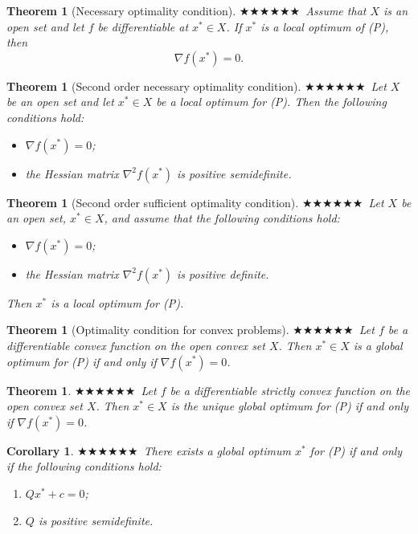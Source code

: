 \documentclass[11pt,a4paper]{article}
\theoremstyle{breakdef}
\theoremstyle{breakplain}
\newtheorem{theorem}[definition]{Theorem}
\newtheorem{corollary}[definition]{Corollary}
\theoremstyle{remark}
\newcommand{\imp}[1]{\textcolor{impcolor}{%
  \ifcase#1\or$\bigstar$\or$\bigstar\bigstar$\or$\bigstar\bigstar\bigstar$\fi}\ }
\begin{document}
\begin{theorem}[Necessary optimality condition]
    \imp{3}Assume that $X$ is an open set and let $f$ be differentiable at $x^* \in X$. If $x^*$ is a local optimum of (P), then
    \[
        \nabla f(x^*)=0.
    \]
\end{theorem}

\begin{theorem}[Second order necessary optimality condition]
    \imp{2}Let $X$ be an open set and let $x^* \in X$ be a local optimum for (P). Then the following conditions hold:
    \begin{itemize}
        \item $\nabla f(x^*)=0$;
        \item the Hessian matrix $\nabla^2 f(x^*)$ is positive semidefinite.
    \end{itemize}
\end{theorem}

\begin{theorem}[Second order sufficient optimality condition]
    \imp{3}Let $X$ be an open set, $x^* \in X$, and assume that the following conditions hold:
    \begin{itemize}
        \item $\nabla f(x^*)=0$;
        \item the Hessian matrix $\nabla^2 f(x^*)$ is positive definite.
    \end{itemize}
    Then $x^*$ is a local optimum for (P).
\end{theorem}

\begin{theorem}[Optimality condition for convex problems]
    \imp{3}Let $f$ be a differentiable convex function on the open convex set $X$. Then $x^* \in X$ is a global optimum for (P) if and only if $\nabla f(x^*)=0$.
\end{theorem}

\begin{theorem}
    \imp{2}Let $f$ be a differentiable strictly convex function on the open convex set $X$. Then $x^* \in X$ is the unique global optimum for (P) if and only if $\nabla f(x^*)=0$.
\end{theorem}

\begin{corollary}
    \imp{3}There exists a global optimum $x^*$ for (P) if and only if the following conditions hold:
    \begin{enumerate}[label=(\roman*)]
        \item $Qx^*+c=0$;
        \item $Q$ is positive semidefinite.
    \end{enumerate}
\end{corollary}
\end{document}

